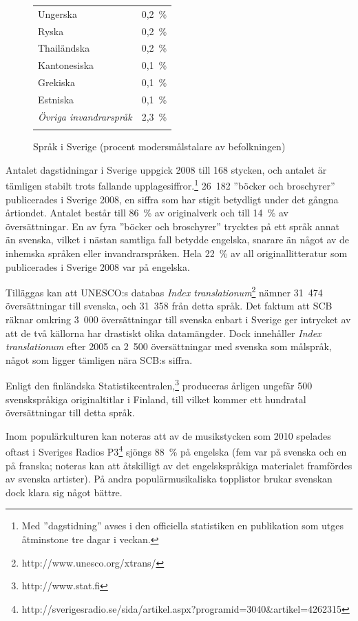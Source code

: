 \begin{multicols}{2}
\begin{figure}[!h]
\begin{tabular}{lc}
Ungerska & 0,2~\% \\  \addlinespace
Ryska & 0,2~\% \\  \addlinespace
Thailändska & 0,2~\% \\  \addlinespace
Kantonesiska & 0,1~\% \\  \addlinespace
Grekiska & 0,1~\% \\  \addlinespace
Estniska & 0,1~\% \\  \addlinespace
\textit{Övriga invandrarspråk} & 2,3~\% \\  \addlinespace
\end{tabular}
\caption{Språk i Sverige (procent modersmålstalare av befolkningen)}
\label{fig:swedish_langs_sv}
\end{figure}


Antalet dagstidningar i Sverige uppgick 2008 till 168 stycken, och
antalet är tämligen stabilt trots fallande upplagesiffror.\footnote{Med
  ''dagstidning'' avses i den officiella statistiken en publikation som
  utges åtminstone tre dagar i veckan.} 26~182 ''böcker och
broschyrer'' publicerades i Sverige 2008, en siffra som har stigit
betydligt under det gångna årtiondet. Antalet består till 86~\% av
originalverk och till 14~\% av översättningar. En av fyra ''böcker och
broschyrer'' trycktes på ett språk annat än svenska, vilket i nästan
samtliga fall betydde engelska, snarare än något av de inhemska
språken eller invandrarspråken. Hela 22~\% av all
originallitteratur som publicerades i Sverige 2008 var på engelska.

Tilläggas kan att UNESCO:s databas \textit{Index
  translationum}\footnote{http://www.unesco.org/xtrans/} nämner 31~474
översättningar till svenska, och 31~358 från detta språk. Det faktum
att SCB räknar omkring 3~000 översättningar till svenska enbart i
Sverige ger intrycket av att de två källorna har drastiskt olika
datamängder. Dock innehåller \textit{Index translationum} efter 2005
ca 2~500 översättningar med svenska som målspråk, något som ligger
tämligen nära SCB:s siffra.

Enligt den finländska Statistikcentralen,\footnote{http://www.stat.fi}
produceras årligen ungefär 500 svenskspråkiga originaltitlar i
Finland, till vilket kommer ett hundratal översättningar till detta
språk.

Inom populärkulturen kan noteras att av de musikstycken som 2010
spelades oftast i Sveriges Radios
P3\footnote{http://sverigesradio.se/sida/artikel.aspx?programid=3040\&artikel=4262315}
sjöngs 88~\% på engelska (fem var på svenska och en på franska;
noteras kan att åtskilligt av det engelskspråkiga materialet
framfördes av svenska artister). På andra populärmusikaliska
topplistor brukar svenskan dock klara sig något bättre.


\end{multicols}
